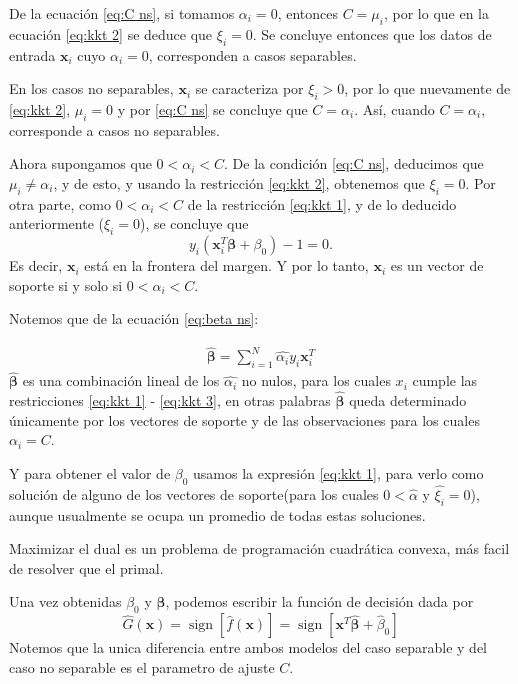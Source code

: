 \documentclass[letterpaper,12pt,oneside]{book}
\begin{document}
{{{De la ecuación \ref{eq:C ns}, si tomamos \( \alpha_i = 0 \), entonces \( C = \mu_i \), por lo que en la ecuación \ref{eq:kkt 2} se deduce que \( \xi_i = 0 \). Se concluye entonces que los datos de entrada \( \mathbf{x}_i \) cuyo \( \alpha_i = 0 \), corresponden a casos separables.

En los casos no separables, \( \mathbf{x}_i \) se caracteriza por \( \xi_i > 0 \), por lo que nuevamente de \eqref{eq:kkt 2}, \( \mu_i = 0 \) y por \ref{eq:C ns} se concluye que \( C = \alpha_i \). Así, cuando \( C = \alpha_i \), corresponde a casos no separables.

Ahora supongamos que \( 0 < \alpha_i < C \). De la condición \eqref{eq:C ns}, deducimos que \( \mu_i \neq \alpha_i \), y de esto, y usando la restricción \eqref{eq:kkt 2}, obtenemos que \( \xi_i = 0 \). Por otra parte, como \( 0 < \alpha_i < C \) de la restricción \eqref{eq:kkt 1}, y de lo deducido anteriormente (\( \xi_i = 0 \)), se concluye que
$$ y_i \left( \mathbf{x}_i^T \boldsymbol{\beta} + \beta_0 \right) - 1 = 0. $$
Es decir, \( \mathbf{x}_i \) está en la frontera del margen. Y por lo tanto, \( \mathbf{x}_i \) es un vector de soporte si y solo si \( 0 < \alpha_i < C \).

        
        Notemos que de la ecuación \eqref{eq:beta ns}:
        
\begin{align}
	\hat{\boldsymbol{\beta}}= \sum_{i=1}^{N} \hat{\alpha_i}  y_i \mathbf{x}_i^T  				\label{eq:beta ns}
\end{align}
        $\hat{\boldsymbol{\beta}}$ es una combinación lineal de los $\hat{\alpha_i}$ no nulos, para los cuales $x_i$ cumple las restricciones \eqref{eq:kkt 1} - \eqref{eq:kkt 3}, en otras palabras $\hat{\boldsymbol{\beta}}$ queda determinado únicamente por los vectores de  soporte y de las observaciones para los cuales $\alpha_i=C$.
    
        Y para obtener el valor de $\beta_0$ usamos la expresión \eqref{eq:kkt 1}, para verlo como solución de alguno de los vectores de soporte(para los cuales $0<\hat{\alpha} $ y $\hat{\xi_i}=0$), aunque usualmente se ocupa un promedio de todas estas soluciones.
    
        Maximizar el dual es un problema de programación cuadrática convexa, más facil de resolver que el primal.
    
        Una vez obtenidas $\beta_0$ y $\boldsymbol{\beta}$, podemos escribir la función de decisión dada por 
        \begin{equation}
            \hat{G}(\mathbf{x}) = \operatorname{sign}\left[\hat{f}(\mathbf{x})\right] = \operatorname{sign}\left[\mathbf{x}^T \hat{\boldsymbol{\beta}} + \hat{\beta}_0\right]
        \end{equation}
        Notemos que la unica diferencia entre ambos modelos del caso separable y del caso no separable es el parametro de ajuste $C$. }




}}
\end{document}

